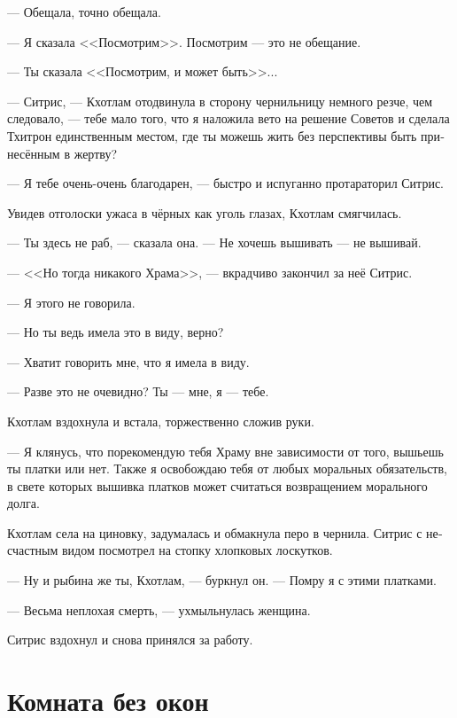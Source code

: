 \documentclass[a4paper,12pt,fleqn]{book}\usepackage{polyglossia}\setdefaultlanguage[babelshorthands=true]{russian}\setotherlanguage{english}\defaultfontfeatures{Ligatures=TeX,Mapping=tex-text}\usepackage{xcolor}\newcommand{\ml}[3]{#2}
\begin{document}
--- Обещала, точно обещала.

--- Я сказала <<Посмотрим>>.
Посмотрим --- это не обещание.

--- Ты сказала <<Посмотрим, и может быть>>...

--- Ситрис, --- Кхотлам отодвинула в сторону чернильницу немного резче, чем следовало, --- тебе мало того, что я наложила вето на решение Советов и сделала Тхитрон единственным местом, где ты можешь жить без перспективы быть принесённым в жертву?

--- Я тебе очень-очень благодарен, --- быстро и испуганно протараторил Ситрис.

Увидев отголоски ужаса в чёрных как уголь глазах, Кхотлам смягчилась.

--- Ты здесь не раб, --- сказала она.
--- Не хочешь вышивать --- не вышивай.

--- <<Но тогда никакого Храма>>, --- вкрадчиво закончил за неё Ситрис.

\ml{$0$}
{--- Я этого не говорила.}
{``I've never told that.''}

\ml{$0$}
{--- Но ты ведь имела это в виду, верно?}
{``But you meant that, didn't you?''}

\ml{$0$}
{--- Хватит говорить мне, что я имела в виду.}
{``Stop telling me what I meant.''}

\ml{$0$}
{--- Разве это не очевидно?}
{``Isn't that obvious?}
\ml{$0$}
{Ты --- мне, я --- тебе.}
{It's give and take.''}

Кхотлам вздохнула и встала, торжественно сложив руки.

--- Я клянусь, что порекомендую тебя Храму вне зависимости от того, вышьешь ты платки или нет.
Также я освобождаю тебя от любых моральных обязательств, в свете которых вышивка платков может считаться возвращением морального долга.

Кхотлам села на циновку, задумалась и обмакнула перо в чернила.
Ситрис с несчастным видом посмотрел на стопку хлопковых лоскутков.

--- Ну и рыбина же ты, Кхотлам, --- буркнул он.
--- Помру я с этими платками.

--- Весьма неплохая смерть, --- ухмыльнулась женщина.

Ситрис вздохнул и снова принялся за работу.

\chapter{Комната без окон}
\end{document}
